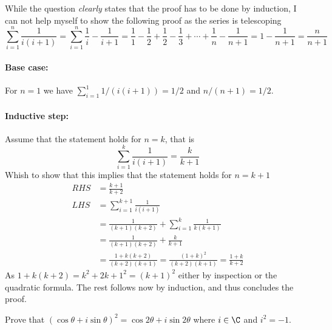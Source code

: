 \documentclass[a4paper, english, 12pt]{article} %
\begin{document}
\begin{answer}
  While the question \emph{clearly} states that the proof has to be done by
  induction, I can not help myself to show the following proof as the series is
  telescoping
  \begin{equation*}
    \sum_{i = 1}^n \frac{1}{i(i+1)}
    = \sum_{i=1}^n \frac{1}{i} - \frac{1}{i+1}
    = \frac{1}{1} - \frac{1}{2} + \frac{1}{2} - \frac{1}{3} + \cdots
    + \frac{1}{n} - \frac{1}{n+1}
    = 1 - \frac{1}{n+1} = \frac{n}{n+1}
  \end{equation*}
  \paragraph{Base case:} For $n=1$ we have $\sum_{i=1}^1 1/(i(i+1)) = 1/2$ and
  $n/(n+1)=1/2$.
  \paragraph{Inductive step:} Assume that the statement holds for $n=k$, that is
  \begin{equation*}
    \sum_{i = 1}^k \frac{1}{i(i+1)} = \frac{k}{k+1}
  \end{equation*}
  Whish to show that this implies that the statement holds for $n=k+1$
  \begin{align*}
    RHS & = \frac{k+1}{k+2} \\
    LHS & = \sum_{i = 1}^{k+1} \frac{1}{i(i+1)} \\
        & = \frac{1}{(k+1)(k+2)} + \sum_{i=1}^{k} \frac{1}{k(k+1)} \\
        & = \frac{1}{(k+1)(k+2)} + \frac{k}{k+1} \\
        & = \frac{1 + k(k+2)}{(k+2)(k+1)} 
          = \frac{(1+k)^2}{(k+2)(k+1)} = \frac{1+k}{k+2}
  \end{align*}
  As $1 + k(k+2) = k^2 + 2k + 1^2 = (k+1)^2$ either by inspection or
  the quadratic formula. The rest follows now by induction, and thus concludes
  the proof.
\end{answer}


\begin{problem}[12]
  \begin{subproblem}
    Prove that $(\cos \theta + i \sin \theta)^2 = \cos 2\theta + i \sin
    2\theta$ where $i \in \C$ and $i^2 = -1$.
  \end{subproblem}
\end{problem}
\end{document}
